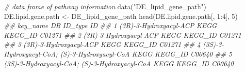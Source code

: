 \documentclass[]{article}
\newcommand{\hlnum}[1]{\textcolor[rgb]{0.816,0.125,0.439}{#1}}%
\newcommand{\hlstr}[1]{\textcolor[rgb]{0.251,0.627,0.251}{#1}}%
\newcommand{\hlcom}[1]{\textcolor[rgb]{0.502,0.502,0.502}{\textit{#1}}}%
\newcommand{\hlopt}[1]{\textcolor[rgb]{0,0,0}{#1}}%
\newcommand{\hlstd}[1]{\textcolor[rgb]{0.251,0.251,0.251}{#1}}%
\newcommand{\hlkwd}[1]{\textcolor[rgb]{0.878,0.439,0.125}{#1}}%
\newenvironment{Shaded}{\begin{myshaded}}{\end{myshaded}}
\newcommand{\KeywordTok}[1]{\hlkwd{#1}}
\newcommand{\DecValTok}[1]{\hlnum{#1}}
\newcommand{\StringTok}[1]{\hlstr{#1}}
\newcommand{\CommentTok}[1]{\hlcom{#1}}
\newcommand{\OperatorTok}[1]{\hlopt{#1}}
\newcommand{\NormalTok}[1]{\hlstd{#1}}
\begin{document}
\begin{Shaded}
\begin{Highlighting}[]
\CommentTok{# data frame of pathway information}
\KeywordTok{data}\NormalTok{(}\StringTok{"DE_lipid_gene_path"}\NormalTok{)}
\NormalTok{DE.lipid.gene.path <-}\StringTok{ }\NormalTok{DE_lipid_gene_path}
\KeywordTok{head}\NormalTok{(DE.lipid.gene.path[, }\DecValTok{1}\OperatorTok{:}\DecValTok{4}\NormalTok{], }\DecValTok{5}\NormalTok{)}
\CommentTok{##                                        key_name   DB ID_type     ID}
\CommentTok{## 1                        (3R)-3-Hydroxyacyl-ACP KEGG KEGG_ID C01271}
\CommentTok{## 2                        (3R)-3-Hydroxyacyl-ACP KEGG KEGG_ID C01271}
\CommentTok{## 3                        (3R)-3-Hydroxyacyl-ACP KEGG KEGG_ID C01271}
\CommentTok{## 4 (3S)-3-Hydroxyacyl-CoA; (S)-3-Hydroxyacyl-CoA KEGG KEGG_ID C00640}
\CommentTok{## 5 (3S)-3-Hydroxyacyl-CoA; (S)-3-Hydroxyacyl-CoA KEGG KEGG_ID C00640}


\end{Highlighting}
\end{Shaded}
\end{document}
